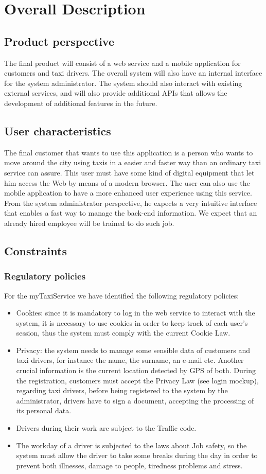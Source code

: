\documentclass[a4paper,12pt]{article}%
\begin{document}
\section{Overall Description}
\subsection{Product perspective}
The final product will consist of a web service and a mobile application for customers and taxi drivers.
The overall system will also have an internal interface for the system administrator. The system should also interact with existing external services, and will also provide additional APIs that allows the development of additional features in the future. 
\subsection{User characteristics}
The final customer that wants to use this application is a person who wants to move around the city using taxis in a easier and faster way than an ordinary taxi service can assure. This user must have some kind of digital equipment that let him access the Web by means of a modern browser. The user can also use the mobile application to have a more enhanced user experience using this service.
From the system administrator perspective, he expects a very intuitive interface that enables a fast way to manage the back-end information. We expect that an already hired employee will be trained to do such job.
\subsection{Constraints}
\subsubsection{Regulatory policies}
For the myTaxiService we have identified the following regulatory policies:
\begin{itemize}
\item Cookies: since it is mandatory to log in the web service to interact with the system, it is necessary to use cookies in order to keep track of each user's session, thus the system must comply with the current Cookie Law.
\item Privacy: the system needs to manage some sensible data of customers and taxi drivers, for instance the name, the surname, an e-mail etc. Another crucial information is the current location detected by GPS of both. During the registration, customers must accept the Privacy Law (see login mockup), regarding taxi drivers, before being registered to the system by the administrator, drivers have to sign a document, accepting the processing of its personal data.
\item Drivers during their work are subject to the Traffic code.
\item The workday of a driver is subjected to the laws about Job safety, so the system must allow the driver to take some breaks during the day in order to prevent both illnesses, damage to people, tiredness problems and stress.
\end{itemize}
\end{document}
